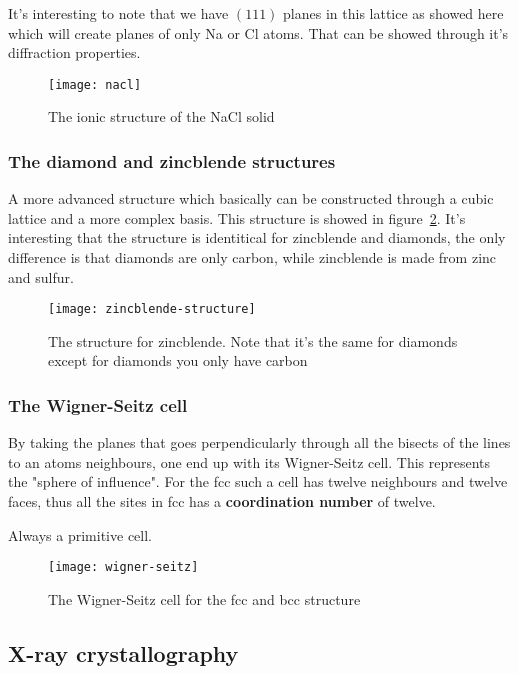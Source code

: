 \documentclass[11pt]{article}
\begin{document}
It's interesting to note that we have $(111)$ planes in this lattice as showed here which will create planes of only Na or Cl atoms. That can be showed through it's diffraction properties. 
\begin{figure}[H]
	\centering
	\texttt{[image: nacl]}
	\caption{The ionic structure of the NaCl solid}
	\label{fig:nacl}
\end{figure}
\newpage
\subsubsection{The diamond and zincblende structures}
A more advanced structure which basically can be constructed through a cubic lattice and a more complex basis. This structure is showed in figure~\ref{fig:zincblende-structure}. It's interesting that the structure is identitical for zincblende and diamonds, the only difference is that diamonds are only carbon, while zincblende is made from zinc and  sulfur.
\begin{figure}[H]
	\centering
	\texttt{[image: zincblende-structure]}
	\caption{The structure for zincblende. Note that it's the same for diamonds except for diamonds you only have carbon}
	\label{fig:zincblende-structure}
\end{figure}

\newpage
\subsubsection{The Wigner-Seitz cell}
By taking the planes that goes perpendicularly  through all the bisects of the lines to an atoms neighbours, one end up with its Wigner-Seitz cell. This represents the "sphere of influence". For the fcc such a cell has twelve neighbours and twelve faces, thus all the sites in fcc has a \textbf{coordination number} of twelve.

Always a primitive cell.
\begin{figure}[H]
	\centering
	\texttt{[image: wigner-seitz]}
	\caption{The Wigner-Seitz cell for the fcc and bcc structure}
	\label{fig:wigner-seitz}
\end{figure}

\newpage
\subsection{X-ray crystallography}
\end{document}
